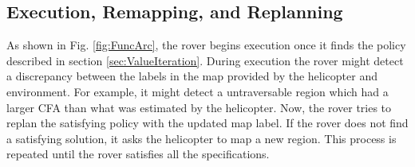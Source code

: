 \documentclass[letterpaper]{article} %
\newcommand{\sofie}[1]{{\color{purple} [Sofie] #1}}
\begin{document}


\subsection{Execution, Remapping, and Replanning}
\label{sec:replanning}

As shown in Fig. \ref{fig:FuncArc}, the rover begins execution once it finds the policy described in section \ref{sec:ValueIteration}. 
During execution the rover might detect a discrepancy between the labels in the map provided by the helicopter and environment. 
For example, it might detect a untraversable region which had a larger CFA than what was estimated by the helicopter. 
Now, the rover tries to replan the satisfying policy with the updated map label. If the rover does not find a satisfying solution, it asks the helicopter to map a new region. This process is repeated until the rover satisfies all the specifications.

\end{document}
